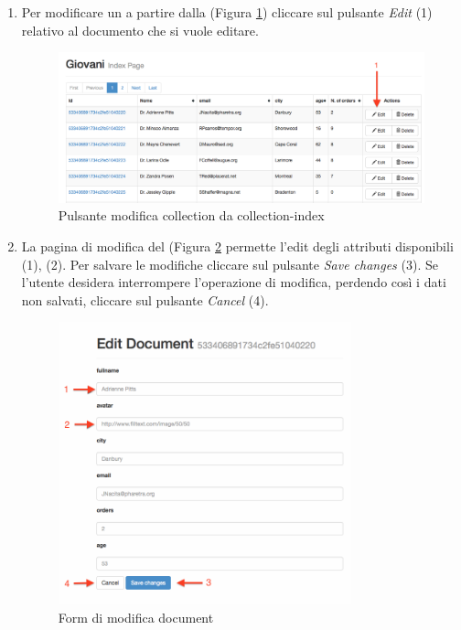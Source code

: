 		\begin{enumerate}

			\item Per modificare un  a partire dalla  (Figura \ref{fig:modificadocumentdacollectionindex}) cliccare sul pulsante \emph{Edit} (1) relativo al documento che si vuole editare. 

				\begin{figure}[H]
					\centering \includegraphics[width=1\textwidth]{img/modificadocumentdacollectionindex.png}
				\caption{\label{fig:modificadocumentdacollectionindex} Pulsante modifica collection da collection-index}
				\end{figure}

			\item \label{modificaDocumentForm} La pagina di modifica del  (Figura \ref{fig:modificaDocumentForm} permette l'edit degli attributi disponibili (1), (2). Per salvare le modifiche cliccare sul pulsante \emph{Save changes} (3). Se l'utente desidera interrompere l'operazione di modifica, perdendo così i dati non salvati, cliccare sul pulsante \emph{Cancel} (4). 

				\begin{figure}[H]
					\centering \includegraphics[width=0.8\textwidth]{img/modificaDocumentForm.png}
					\caption{\label{fig:modificaDocumentForm} Form di modifica document}
				\end{figure}

		\end{enumerate}

